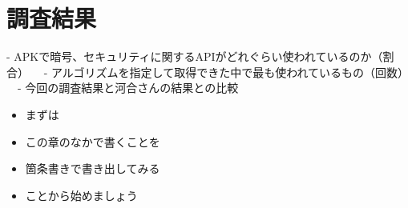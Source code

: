 \newpage
\section{調査結果}
- APKで暗号、セキュリティに関するAPIがどれぐらい使われているのか（割合）
　- アルゴリズムを指定して取得できた中で最も使われているもの（回数）
　- 今回の調査結果と河合さんの結果との比較

\begin{itemize}
\item まずは
\item この章のなかで書くことを
\item 箇条書きで書き出してみる
\item ことから始めましょう
\end{itemize}